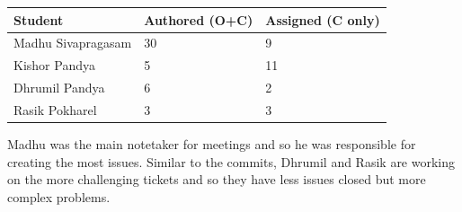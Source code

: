 \documentclass{article}
\begin{document}
\begin{table}[H]
\centering
\begin{tabular}{lll}
\toprule
\textbf{Student} & \textbf{Authored (O+C)} & \textbf{Assigned (C only)}\\
\midrule
Madhu Sivapragasam & 30 & 9 \\
Kishor Pandya & 5 & 11 \\
Dhrumil Pandya & 6 & 2 \\
Rasik Pokharel & 3 & 3 \\
\bottomrule
\end{tabular}
\end{table}

Madhu was the main notetaker for meetings and so he was responsible for creating the most issues. Similar to the commits, Dhrumil and Rasik are working on the more challenging tickets and so they have less issues closed but more complex problems. 
\end{document}
